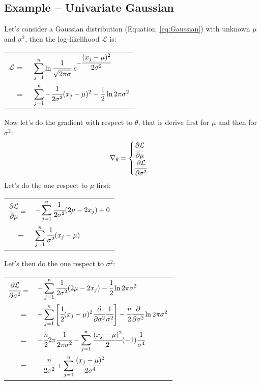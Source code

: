\subsection{Example -- Univariate Gaussian}
Let's consider a Gaussian distribution (Equation~\ref{eq:Gaussian}) with unknown $\mu$ and $\sigma^2$, then the log-likelihood $\mathcal{L}$ is:
\begin{center}
\begin{tabular}{rl}
	$\displaystyle \mathcal{L}=$&$\displaystyle\displaystyle\sum_{j=1}^n\ln{\cfrac{1}{\sqrt{2\pi\sigma}}~e^{-\cfrac{(x_j-\mu)^2}{2\sigma^2}}}$\\
	$=$&$\displaystyle \displaystyle\sum_{j=1}^n-\cfrac{1}{2\sigma^2}(x_j-\mu)^2-\frac{1}{2}\ln{2\pi\sigma^2}$
\end{tabular}
\end{center}
Now let's do the gradient with respect to $\theta$, that is derive first for $\mu$ and then for $\sigma^2$:
\[\nabla_\theta=
\begin{cases}
	\cfrac{\partial\mathcal{L}}{\partial\mu}\\
	\cfrac{\partial\mathcal{L}}{\partial\sigma^2}\\
\end{cases}
\]
Let's do the one respect to $\mu$ first:
\begin{center}
\begin{tabular}{rl}
	$\cfrac{\partial\mathcal{L}}{\partial\mu}=$&$\displaystyle -\displaystyle\sum_{j=1}^n \cfrac{1}{2\sigma^2}(2\mu-2x_j)+0$\\
	$=$&$\displaystyle \displaystyle\sum_{j=1}^n\cfrac{1}{\sigma^2}(x_j-\mu)$
\end{tabular}
\end{center}
Let's then do the one respect to $\sigma^2$:
\begin{center}
\begin{tabular}{rl}
	$\cfrac{\partial\mathcal{L}}{\partial\sigma^2}=$&$\displaystyle -\displaystyle\sum_{j=1}^n \cfrac{1}{2\sigma^2}(2\mu-2x_j)-\cfrac{1}{2}\ln{2\pi\sigma^2}$\\
	$=$&$\displaystyle -\displaystyle\sum_{j=1}^n\left[\cfrac{1}{2}(x_j-\mu)^2\cfrac{\partial}{\partial \sigma^2}\cfrac{1}{\sigma^2}\right]-\cfrac{n}{2}\cfrac{\partial}{\partial\sigma^2}\ln{2\pi\sigma^2}$\\
	$=$&$\displaystyle -\cfrac{n}{2}2\pi\cfrac{1}{2\pi\sigma^2}-\displaystyle\sum_{j=1}^n\cfrac{(x_j-\mu)^2}{2}(-1)\cfrac{1}{\sigma^4}$\\
	$=$&$\displaystyle -\cfrac{n}{2\sigma^2}+\displaystyle\sum_{j=1}^n\cfrac{(x_j-\mu)^2}{2\sigma^4}$
\end{tabular}
\end{center}
